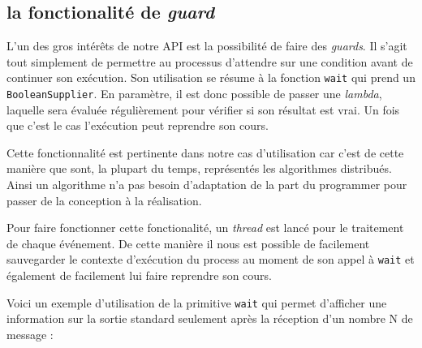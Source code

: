 \documentclass{article}
\begin{document}
					\subsection{la fonctionalité de \emph{guard}}
					L'un des gros intérêts de notre API est la possibilité de faire des
					\emph{guards}. Il s'agit tout simplement de permettre au processus d'attendre
					sur une condition avant de continuer son exécution. Son utilisation se résume à
					la fonction \lstinline{wait} qui prend un \lstinline{BooleanSupplier}.
					En paramètre, il est donc possible de passer une \emph{lambda}, laquelle sera
					évaluée régulièrement pour vérifier si son résultat est vrai.
					Un fois que c'est le cas l'exécution peut reprendre son cours.

					Cette fonctionnalité est pertinente dans notre cas d'utilisation car c'est de
					cette manière que sont, la plupart du temps, représentés les algorithmes
					distribués.
					Ainsi un algorithme n'a pas besoin d'adaptation de la part du programmer pour
					passer de la conception à la réalisation.

					Pour faire fonctionner cette fonctionalité, un \emph{thread} est lancé pour le
					traitement de chaque événement. De cette manière il nous est possible de
					facilement sauvegarder le contexte d'exécution du process au moment de son appel
					à \lstinline{wait} et également de facilement lui faire reprendre son cours.

					Voici un exemple d'utilisation de la primitive \lstinline{wait} qui permet
					d'afficher une information sur la sortie standard seulement après la réception
					d'un nombre N de message :
					
\end{document}
